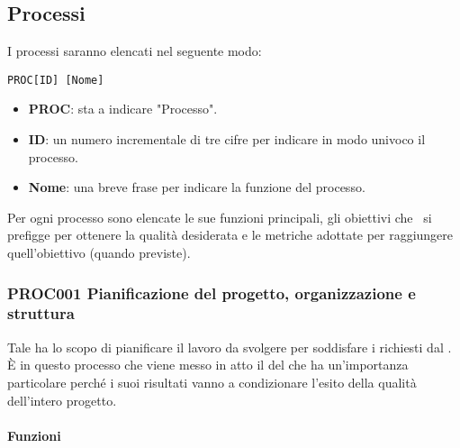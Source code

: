 \subsection{Processi}
I processi saranno elencati nel seguente modo:

\begin{center}
	\texttt{PROC[ID] [Nome]}
\end{center}

\begin{itemize}
	\item \textbf{PROC}: sta a indicare "Processo".
	\item \textbf{ID}: un numero incrementale di tre cifre per indicare in modo univoco il processo.
	\item \textbf{Nome}: una breve frase per indicare la funzione del processo.
\end{itemize}

Per ogni processo sono elencate le sue funzioni principali, gli obiettivi che \gruppo\ si prefigge per ottenere la qualità desiderata e le metriche adottate per raggiungere quell'obiettivo (quando previste).

	\subsubsection{PROC001 Pianificazione del progetto, organizzazione e struttura}
	Tale  ha lo scopo di pianificare il lavoro da svolgere per soddisfare i  richiesti dal . È in questo processo che viene messo in atto il  del  che ha un'importanza particolare perché i suoi risultati vanno a condizionare l'esito della qualità dell'intero progetto.
	
		\paragraph*{Funzioni}
	
